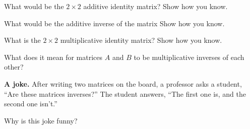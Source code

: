 \documentclass{ximera}
\begin{document}
\begin{question}
What would be the $2\times 2$ additive identity matrix?  Show how you know.  
\begin{freeResponse}
\end{freeResponse}
\end{question}

\begin{question}
What would be the additive inverse of the matrix 
Show how you know.  
\begin{freeResponse}
\end{freeResponse}
\end{question}

\begin{question}
What is the $2\times 2$ multiplicative identity matrix?  Show how you know.
\begin{freeResponse}
\end{freeResponse}
\end{question}

\begin{question}
What does it mean for matrices $A$ and $B$ to be multiplicative inverses of each other?  
\begin{freeResponse}
\end{freeResponse}
\end{question}

\textbf{A joke.}  After writing two matrices on the board, a professor asks a student, ``Are these matrices inverses?''  The student answers, ``The first one is, and the second one isn't.''  
\begin{question}
Why is this joke funny?  
\begin{freeResponse}
\end{freeResponse}
\end{question}
\end{document}

